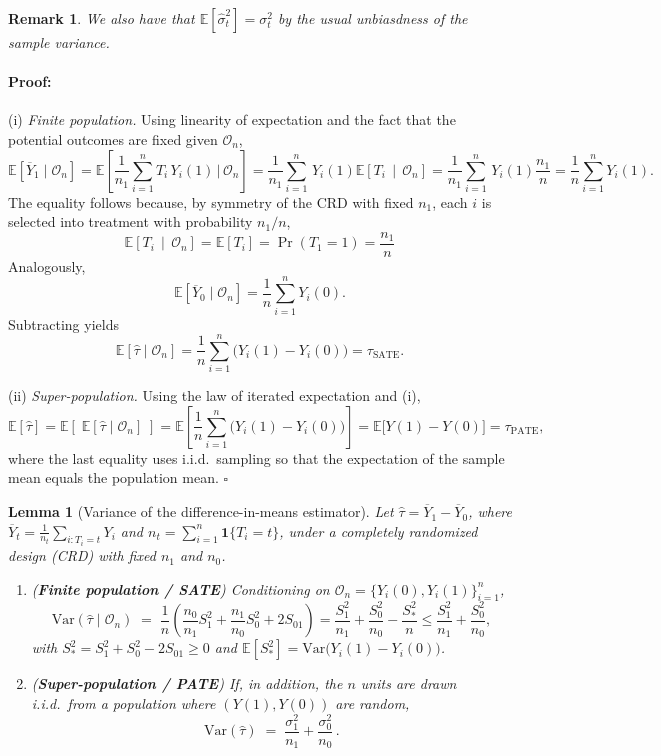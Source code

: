 \documentclass[11pt]{exam}
\theoremstyle{plain}
\newtheorem{remark}{Remark}
\newtheorem{lemma}{Lemma}
\newenvironment{proof}{\paragraph{Proof:}}{\hfill$\square$}
\newcommand{\E}{\mathbb{E}}
\newcommand{\Var}{\mathrm{Var}}
\begin{document}
\begin{remark}
    We also have that $\E[\hat\sigma_t^2] = \sigma_t^2$ by the usual unbiasdness of the sample variance.
\end{remark}

\begin{proof}
(i) \emph{Finite population.} Using linearity of expectation and the fact that the potential outcomes are fixed given $\mathcal O_n$,
\[
\mathbb{E}\!\left[\overline Y_1\mid \mathcal O_n\right]
= \mathbb{E}\!\left[\frac{1}{n_1}\sum_{i=1}^n T_i\,Y_i(1)\,\Big|\, \mathcal O_n\right]
= \frac{1}{n_1}\sum_{i=1}^n \,Y_i(1) \mathbb{E}\!\left[ T_i\,\mid\, \mathcal O_n\right]
= \frac{1}{n_1}\sum_{i=1}^n \,Y_i(1) \frac{n_1}{n}
= \frac{1}{n}\sum_{i=1}^n Y_i(1).
\]
The equality follows because, by symmetry of the CRD with fixed $n_1$, each $i$ is selected into treatment with probability $n_1/n$, 
\[
\mathbb{E}\!\left[ T_i\, \mid \, \mathcal O_n\right] = \mathbb{E}\!\left[ T_i\right] = \Pr(T_1 = 1) = \frac{n_1}{n}
\]
Analogously,
\[
\mathbb{E}\!\left[\overline Y_0\mid \mathcal O_n\right]
= \frac{1}{n}\sum_{i=1}^n Y_i(0).
\]
Subtracting yields
\[
\mathbb{E}\!\left[\hat\tau\mid \mathcal O_n\right]
= \frac{1}{n}\sum_{i=1}^n \big(Y_i(1)-Y_i(0)\big)
= \tau_{\mathrm{SATE}}.
\]

(ii) \emph{Super-population.} Using the law of iterated expectation and (i),
\[
\mathbb{E}[\hat\tau]
= \mathbb{E}\!\left[\;\mathbb{E}[\hat\tau \mid \mathcal O_n]\;\right]
= \mathbb{E}\!\left[\frac{1}{n}\sum_{i=1}^n \big(Y_i(1)-Y_i(0)\big)\right]
= \mathbb{E}\!\big[Y(1)-Y(0)\big]
= \tau_{\mathrm{PATE}},
\]
where the last equality uses i.i.d.\ sampling so that the expectation of the sample mean equals the population mean.
\end{proof}

\begin{lemma}[Variance of the difference-in-means estimator]
\label{lem:var}
Let $\hat\tau=\overline Y_1-\overline Y_0$, where $\overline Y_t=\frac{1}{n_t}\sum_{i:T_i=t}Y_i$ and $n_t=\sum_{i=1}^n\mathbf 1\{T_i=t\}$, under a completely randomized design (CRD) with fixed $n_1$ and $n_0$.
\begin{enumerate}[label=(\roman*)]
    \item (\textbf{Finite population / SATE}) Conditioning on $\mathcal O_n=\{Y_i(0),Y_i(1)\}_{i=1}^n$,
    \[
    \Var(\hat\tau \mid \mathcal O_n)
    \;=\; \frac{1}{n}\!\left(\frac{n_0}{n_1}S_1^2+\frac{n_1}{n_0}S_0^2+2S_{01}\right) = \frac{S_1^2}{n_1}+\frac{S_0^2}{n_0}-\frac{S_\ast^2}{n} \leq \frac{S_1^2}{n_1}+\frac{S_0^2}{n_0},
    \]
    with $S_\ast^2=S_1^2+S_0^2-2S_{01} \geq 0$ and $\E\left[S_\ast^2\right] = \Var\!\big(Y_i(1)-Y_i(0)\big)$.
    \item (\textbf{Super-population / PATE}) If, in addition, the $n$ units are drawn i.i.d.\ from a population where $(Y(1),Y(0))$ are random,
    \[
    \Var(\hat\tau)
    \;=\; \frac{\sigma_1^2}{n_1}+\frac{\sigma_0^2}{n_0}\,.
    \]
\end{enumerate}
\end{lemma}
\end{document}
